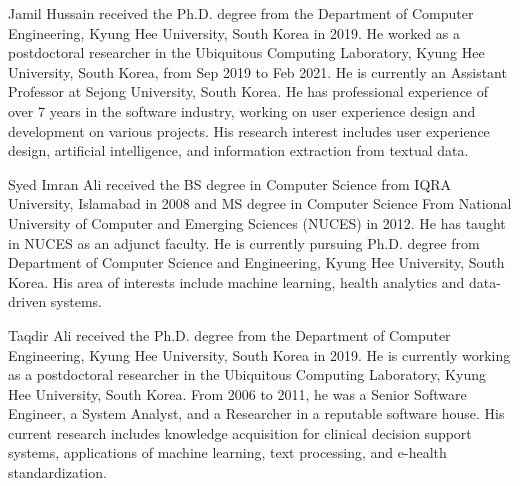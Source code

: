 \documentclass{ieeeaccess}
\begin{document}
\begin{IEEEbiography}{Jamil Hussain} received the Ph.D. degree from the Department of Computer Engineering, Kyung Hee University, South Korea in 2019. He worked as a postdoctoral researcher in the Ubiquitous Computing Laboratory, Kyung Hee University, South Korea, from Sep 2019 to Feb 2021. He is currently an Assistant Professor at Sejong University, South Korea. He has professional experience of over 7 years in the software industry, working on user experience design and development on various projects. His research interest includes user experience design, artificial intelligence, and information extraction from textual data.
\end{IEEEbiography}
\begin{IEEEbiography}{Syed Imran Ali} received the BS degree in Computer Science from IQRA University, Islamabad in 2008 and MS degree in Computer Science From National University of Computer and Emerging Sciences (NUCES) in 2012. He has taught in NUCES as an adjunct faculty. He is currently pursuing Ph.D. degree from Department of Computer Science and Engineering, Kyung Hee University, South Korea. His area of interests include machine learning, health analytics and data-driven systems.
\end{IEEEbiography}
\begin{IEEEbiography}{Taqdir Ali} received the Ph.D. degree from the Department of Computer Engineering, Kyung Hee University, South Korea in 2019. He is currently working as a postdoctoral researcher in the Ubiquitous Computing Laboratory, Kyung Hee University, South Korea. From 2006 to 2011, he was a Senior Software Engineer, a System Analyst, and a Researcher in a reputable software house. His current research includes knowledge acquisition for clinical decision support systems, applications of machine learning, text processing, and e-health standardization.
\end{IEEEbiography}
\end{document}
